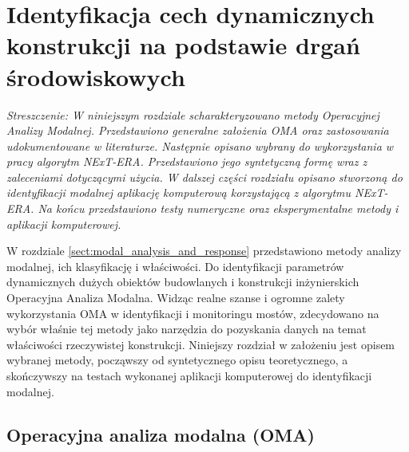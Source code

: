 \chapter{Identyfikacja cech dynamicznych konstrukcji na podstawie drgań środowiskowych}

\textit{Streszczenie: W niniejszym rozdziale scharakteryzowano metody Operacyjnej Analizy Modalnej. Przedstawiono generalne założenia OMA oraz zastosowania udokumentowane w literaturze. Następnie opisano wybrany do wykorzystania w pracy algorytm NExT-ERA. Przedstawiono jego syntetyczną formę wraz z zaleceniami dotyczącymi użycia. W dalszej części rozdziału opisano stworzoną do identyfikacji modalnej aplikację komputerową korzystającą z algorytmu NExT-ERA. Na końcu przedstawiono testy numeryczne oraz eksperymentalne metody i aplikacji komputerowej.}

\vspace{1cm}

W rozdziale \ref{sect:modal_analysis_and_response} przedstawiono metody analizy modalnej, ich klasyfikację i właściwości. Do identyfikacji parametrów dynamicznych dużych obiektów budowlanych i konstrukcji inżynierskich  Operacyjna Analiza Modalna. Widząc realne szanse i ogromne zalety wykorzystania OMA w identyfikacji i monitoringu mostów, zdecydowano na wybór właśnie tej metody jako narzędzia do pozyskania danych na temat właściwości rzeczywistej konstrukcji. Niniejszy rozdział w założeniu jest  opisem wybranej metody, począwszy od syntetycznego opisu teoretycznego, a skończywszy na testach wykonanej aplikacji komputerowej do identyfikacji modalnej. 

\section{Operacyjna analiza modalna (OMA)} \label{sect:OMA}
